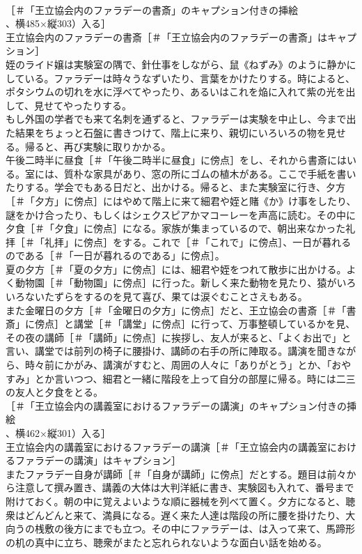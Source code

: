 \documentclass[8pt]{extreport}
\begin{document}
\begin{CJK}{UTF8}{min}
\\	［＃「王立協会内のファラデーの書斎」のキャプション付きの挿絵
\\	、横485×縦303）入る］
\\	王立協会内のファラデーの書斎［＃「王立協会内のファラデーの書斎」はキャプション］ 
\\	姪のライド嬢は実験室の隅で、針仕事をしながら、鼠《ねずみ》のように静かにしている。ファラデーは時々うなずいたり、言葉をかけたりする。時によると、ポタシウムの切れを水に浮べてやったり、あるいはこれを焔に入れて紫の光を出して、見せてやったりする。
\\	もし外国の学者でも来て名刺を通ずると、ファラデーは実験を中止し、今まで出た結果をちょっと石盤に書きつけて、階上に来り、親切にいろいろの物を見せる。帰ると、再び実験に取りかかる。
\\	午後二時半に昼食［＃「午後二時半に昼食」に傍点］をし、それから書斎にはいる。室には、質朴な家具があり、窓の所にゴムの植木がある。ここで手紙を書いたりする。学会でもある日だと、出かける。帰ると、また実験室に行き、夕方［＃「夕方」に傍点］にはやめて階上に来て細君や姪と賭《か》け事をしたり、謎をかけ合ったり、もしくはシェクスピアかマコーレーを声高に読む。その中に夕食［＃「夕食」に傍点］になる。家族が集まっているので、朝出来なかった礼拝［＃「礼拝」に傍点］をする。これで［＃「これで」に傍点］、一日が暮れるのである［＃「一日が暮れるのである」に傍点］。
\\	夏の夕方［＃「夏の夕方」に傍点］には、細君や姪をつれて散歩に出かける。よく動物園［＃「動物園」に傍点］に行った。新しく来た動物を見たり、猿がいろいろないたずらをするのを見て喜び、果ては涙ぐむことさえもある。
\\	また金曜日の夕方［＃「金曜日の夕方」に傍点］だと、王立協会の書斎［＃「書斎」に傍点］と講堂［＃「講堂」に傍点］に行って、万事整頓しているかを見、その夜の講師［＃「講師」に傍点］に挨拶し、友人が来ると、「よくお出で」と言い、講堂では前列の椅子に腰掛け、講師の右手の所に陣取る。講演を聞きながら、時々前にかがみ、講演がすむと、周囲の人々に「ありがとう」とか、「おやすみ」とか言いつつ、細君と一緒に階段を上って自分の部屋に帰る。時には二三の友人と夕食をとる。
\\	［＃「王立協会内の講義室におけるファラデーの講演」のキャプション付きの挿絵
\\	、横462×縦301）入る］
\\	王立協会内の講義室におけるファラデーの講演［＃「王立協会内の講義室におけるファラデーの講演」はキャプション］ 
\\	またファラデー自身が講師［＃「自身が講師」に傍点］だとする。題目は前々から注意して撰み置き、講義の大体は大判洋紙に書き、実験図も入れて、番号まで附けておく。朝の中に覚えよいような順に器械を列べて置く。夕方になると、聴衆はどんどんと来て、満員になる。遅く来た人達は階段の所に腰を掛けたり、大向うの桟敷の後方にまでも立つ。その中にファラデーは、は入って来て、馬蹄形の机の真中に立ち、聴衆がまたと忘れられないような面白い話を始める。

\end{CJK}
\end{document}
